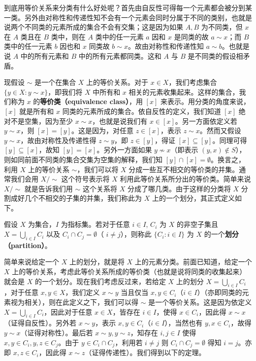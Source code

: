 到底用等价关系来分类有什么好处呢？首先由自反性可得每一个元素都会被分到某一类。另外由对称性和传递性知不会有一个元素会同时分属于不同的类别，也就是说两个不同类的元素所成的集合不会有交集；这是因为如果 $A, B$ 为不同类，但 $x$ 在 $A$ 类且在 $B$ 类中，则在 $A$ 类中的任一元素 $a$ 因和 $x$ 是同类的故 $a \sim x$；而 $B$ 类中的任一元素 $b$ 因也和 $x$ 同类故 $b \sim x$。故由对称性和传递性知 $a \sim b$。也就是说 $A$ 中的所有元素和 $B$ 中的所有元素都同类。这和 $A$ 与 $B$ 是不同类的假设相矛盾。

现假设 $\sim$ 是一个在集合 $X$ 上的等价关系。对于 $x \in X$，我们考虑集合 $\{y \in X : y \sim x\}$，即我们将 $X$ 中所有和 $x$ 相关的元素收集起来。这样的集合，我们称为 $x$ 的{\bf 等价类（equivalence class）}，用 $[x]$ 来表示。用分类的角度来说，$[x]$ 就是所有和 $x$ 同类的元素所成的集合。依自反性的定义，我们知道 $[x]$ 绝对不是空集，因为至少 $x \sim x$，也就是说我们有 $x \in [x]$。另一方面依定义若 $y \sim x$，则 $[x] = [y]$。这是因为，对任意 $z \in [x]$，表示 $z \sim x$。然而又假设 $y \sim x$，故由对称性及传递性得 $z \sim y$，即 $z \in [y]$，得证 $[x] \subseteq [y]$。同理可得 $[y] \subseteq [x]$，故知 $[y] = [x]$。另外一方面如果 $y \nsim x$（即表示 $(y, x) \notin S$），则如同前面不同类的集合交集为空集的解释，我们知 $[y] \cap [x] = \emptyset$。换言之，利用 $X$ 上的等价关系 $\sim$，我们可以将 $X$ 分成一些互不相交的等价类的并集。通常我们会用 $X/ \sim$ 这个符号表示将 $X$ 利用此等价关系所分出的等价类。简单来说 $X/ \sim$ 就是告诉我们用 $\sim$ 这个关系将 $X$ 分成了哪几类。由于这样的分类将 $X$ 分割成好几个不相交的子集的并集，我们称此为 $X$ 上的一个划分，其正式定义如下。

\begin{definition}
假设 $X$ 为集合，$I$ 为指标集。若对于任意 $i \in I$, $C_i$ 为 $X$ 的非空子集且 $X = \bigcup_{i \in I} C_i$ 以及 $C_i \cap C_j = \emptyset$（ $i \neq j$），则称此 $\{C_i : i \in I\}$ 为 $X$ 的一个{\bf 划分（partition）}。
\end{definition}

简单来说给定一个 $X$ 上的划分，就是将 $X$ 上的元素分类。前面已知道，给定一个 $X$ 上的等价关系，考虑此等价关系所成的等价类（也就是说将同类的收集起来）就会是 $X$ 的一个划分。现在我们考虑反过来，若给定 $X$ 上的划分 $X = \bigcup_{i \in I} C_i$，对于任意 $x, y \in X$，我们定义 $x \sim y$ 当且仅当 $x, y \in C_i$（$i \in I$）（亦即同类的元素视为相关），则在此定义之下，我们可以得 $\sim$ 是一个等价关系。这是因为依定义 $X = \bigcup_{i \in I} C_i$，因此对于任意 $x \in X$，皆存在 $i \in I$，使得 $x \in C_i$，因此得 $x \sim x$（证得自反性）。另外若 $x \sim y$，表示 $x, y \in C_i$（$i \in I$），当然也有 $y, x \in C_i$，故得 $y \sim x$（证得对称性）。最后若 $x \sim y, y \sim z$，知存在 $i, j \in I$ 使得 $x, y \in C_i, y, z \in C_j$。由于 $y \in C_i \cap C_j$，利用若 $i \neq j$ 则 $C_i \cap C_j = \emptyset$ 得知 $i = j$。亦即 $x, z \in C_i$，因此得 $x \sim z$（证得传递性）。我们得到以下的定理。

